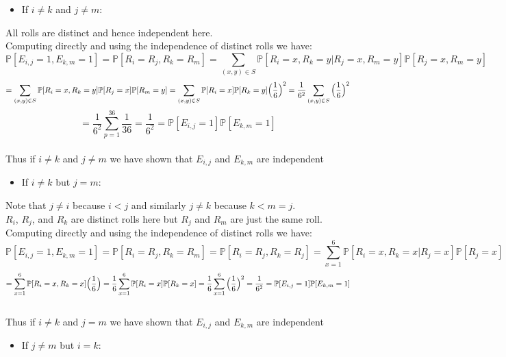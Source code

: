\documentclass{article}
\begin{document}
\begin{itemize}
    \item If $i\neq k$ and $j\neq m$:
\end{itemize}
\begin{center}
\doublespacing
    All rolls are distinct and hence independent here.
    \\Computing directly and using the independence of distinct rolls we have:
    \[\mathbb{P}[E_{i,j} = 1, E_{k,m} = 1] =\mathbb{P}[R_i = R_j, R_k = R_m] =\sum_{(x,y)\in S}\mathbb{P}[R_i = x, R_k = y | R_j = x, R_m = y]\mathbb{P}[R_j = x, R_m = y]\]
    \[=\sum_{(x,y)\in S}\mathbb{P}[R_i = x, R_k = y]\mathbb{P}[R_j = x]\mathbb{P}[R_m = y] =\sum_{(x,y)\in S}\mathbb{P}[R_i = x]\mathbb{P}[R_k = y]\Big{(}\frac{1}{6}\Big{)}^2 =\frac{1}{6^2}\sum_{(x,y)\in S}\Big{(}\frac{1}{6}\Big{)}^2\]
    \[=\frac{1}{6^2}\sum_{p=1}^{36}\frac{1}{36} =\frac{1}{6^2} =\mathbb{P}[E_{i,j} = 1]\mathbb{P}[E_{k,m} = 1]\]
    \\Thus if $i\neq k$ and $j\neq m$ we have shown that $E_{i,j}$ and $E_{k,m}$ are independent \qedsymbol
\end{center}
\begin{itemize}
    \item If $i\neq k$ but $j = m$:
\end{itemize}
\begin{center}
\doublespacing
    Note that $j\neq i$ because $i < j$ and similarly $j\neq k$ because $k < m = j$.
    \\$R_i$, $R_j$, and $R_k$ are distinct rolls here but $R_j$ and $R_m$ are just the same roll.
    \\Computing directly and using the independence of distinct rolls we have:
    \[\mathbb{P}[E_{i,j} = 1, E_{k,m} = 1] =\mathbb{P}[R_i = R_j, R_k = R_m] =\mathbb{P}[R_i = R_j, R_k = R_j] =\sum_{x=1}^6\mathbb{P}[R_i = x, R_k = x | R_j = x]\mathbb{P}[R_j = x]\]
    \[=\sum_{x=1}^6\mathbb{P}[R_i = x, R_k = x]\Big{(}\frac{1}{6}\Big{)} =\frac{1}{6}\sum_{x=1}^6\mathbb{P}[R_i = x]\mathbb{P}[R_k = x] =\frac{1}{6}\sum_{x=1}^6\Big{(}\frac{1}{6}\Big{)}^2 =\frac{1}{6^2} =\mathbb{P}[E_{i,j} = 1]\mathbb{P}[E_{k,m} = 1]\]
    \\Thus if $i\neq k$ and $j = m$ we have shown that $E_{i,j}$ and $E_{k,m}$ are independent \qedsymbol
\end{center}
\begin{itemize}
    \item If $j\neq m$ but $i = k$:
\end{itemize}
\end{document}
